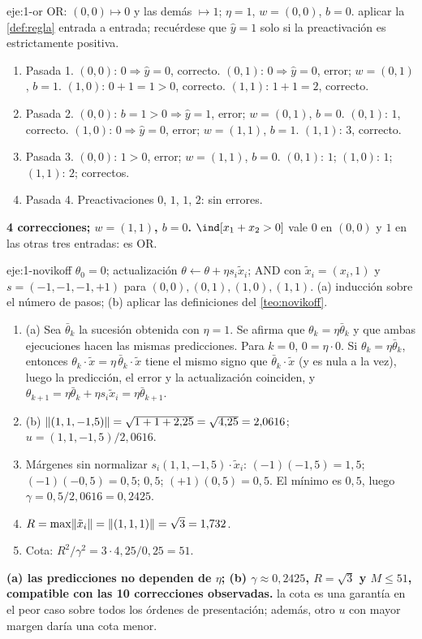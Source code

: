 \begin{solucion}{eje:1-or}
\datos OR: $(0,0)\mapsto 0$ y las demás $\mapsto 1$; $\eta=1$, $w=(0,0)$, $b=0$.
\planteamiento aplicar la \cref{def:regla} entrada a entrada; recuérdese que $\hat y=1$ solo si la preactivación es estrictamente positiva.
\pasos
\begin{enumerate}[label=\arabic*.]
  \item Pasada 1. $(0,0)$: $0\Rightarrow\hat y=0$, correcto. $(0,1)$: $0\Rightarrow\hat y=0$, error; $w=(0,1)$, $b=1$. $(1,0)$: $0+1=1>0$, correcto. $(1,1)$: $1+1=2$, correcto.
  \item Pasada 2. $(0,0)$: $b=1>0\Rightarrow\hat y=1$, error; $w=(0,1)$, $b=0$. $(0,1)$: $1$, correcto. $(1,0)$: $0\Rightarrow\hat y=0$, error; $w=(1,1)$, $b=1$. $(1,1)$: $3$, correcto.
  \item Pasada 3. $(0,0)$: $1>0$, error; $w=(1,1)$, $b=0$. $(0,1)$: $1$; $(1,0)$: $1$; $(1,1)$: $2$; correctos.
  \item Pasada 4. Preactivaciones $0$, $1$, $1$, $2$: sin errores.
\end{enumerate}
\resultado \textbf{4 correcciones; $w=(1,1)$, $b=0$.}
\comprobacion $\ind[x_1+x_2>0]$ vale $0$ en $(0,0)$ y $1$ en las otras tres entradas: es OR.
\end{solucion}

\begin{solucion}{eje:1-novikoff}
\datos $\theta_0=0$; actualización $\theta\leftarrow\theta+\eta s_i\tilde x_i$; AND con $\tilde x_i=(x_i,1)$ y $s=(-1,-1,-1,+1)$ para $(0,0),(0,1),(1,0),(1,1)$.
\planteamiento (a) inducción sobre el número de pasos; (b) aplicar las definiciones del \cref{teo:novikoff}.
\pasos
\begin{enumerate}[label=\arabic*.]
  \item (a) Sea $\bar\theta_k$ la sucesión obtenida con $\eta=1$. Se afirma que $\theta_k=\eta\bar\theta_k$ y que ambas ejecuciones hacen las mismas predicciones. Para $k=0$, $0=\eta\cdot 0$. Si $\theta_k=\eta\bar\theta_k$, entonces $\theta_k\cdot\tilde x=\eta\,\bar\theta_k\cdot\tilde x$ tiene el mismo signo que $\bar\theta_k\cdot\tilde x$ (y es nula a la vez), luego la predicción, el error y la actualización coinciden, y $\theta_{k+1}=\eta\bar\theta_k+\eta s_i\tilde x_i=\eta\bar\theta_{k+1}$.
  \item (b) $\lVert(1,1,-1{,}5)\rVert=\sqrt{1+1+2{,}25}=\sqrt{4{,}25}=2{,}0616$; $u=(1,1,-1{,}5)/2{,}0616$.
  \item Márgenes sin normalizar $s_i(1,1,-1{,}5)\cdot\tilde x_i$: $(-1)(-1{,}5)=1{,}5$; $(-1)(-0{,}5)=0{,}5$; $0{,}5$; $(+1)(0{,}5)=0{,}5$. El mínimo es $0{,}5$, luego $\gamma=0{,}5/2{,}0616=0{,}2425$.
  \item $R=\max\lVert\tilde x_i\rVert=\lVert(1,1,1)\rVert=\sqrt3=1{,}732$.
  \item Cota: $R^{2}/\gamma^{2}=3\cdot 4{,}25/0{,}25=51$.
\end{enumerate}
\resultado \textbf{(a) las predicciones no dependen de $\eta$; (b) $\gamma\approx 0{,}2425$, $R=\sqrt3$ y $M\le 51$, compatible con las 10 correcciones observadas.}
\comprobacion la cota es una garantía en el peor caso sobre todos los órdenes de presentación; además, otro $u$ con mayor margen daría una cota menor.
\end{solucion}

